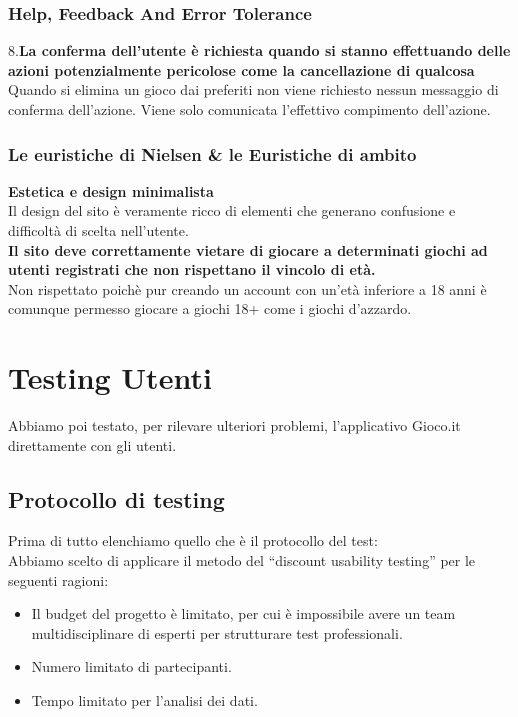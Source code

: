 \documentclass[../Report.tex]{subfiles}
\begin{document}
    \subsubsection{Help, Feedback And Error Tolerance}

    8.\textbf{La conferma dell’utente è richiesta quando si stanno effettuando delle azioni potenzialmente pericolose come la cancellazione di qualcosa \\
    }    
    Quando si elimina un gioco dai preferiti non viene richiesto nessun messaggio di conferma dell'azione. Viene solo comunicata l'effettivo compimento dell'azione.

    \subsubsection{Le euristiche di Nielsen \& le Euristiche di ambito}
        \textbf{Estetica e design minimalista}\\
        Il design del sito è veramente ricco di elementi che generano confusione e difficoltà di scelta nell’utente.\\ 
        \textbf{Il sito deve correttamente vietare di giocare a determinati giochi ad utenti  registrati che non rispettano il vincolo di età.}\\
        Non rispettato poichè pur creando un account con un’età inferiore a 18 anni è comunque permesso giocare a giochi 18+ come i giochi d’azzardo.

    \section{Testing Utenti}
    Abbiamo poi testato, per rilevare ulteriori problemi, l’applicativo Gioco.it direttamente con gli utenti. 
    \subsection{Protocollo di testing }
    Prima di tutto elenchiamo quello che è il protocollo del test:\\
    Abbiamo scelto di applicare il metodo del “discount usability testing” per le seguenti ragioni:
    \begin{itemize}
        \item Il budget del progetto è limitato, per cui è impossibile avere un team multidisciplinare di esperti per strutturare test professionali. 
        \item Numero limitato di partecipanti. 
        \item Tempo limitato per l’analisi dei dati.
    \end{itemize}
\end{document}
